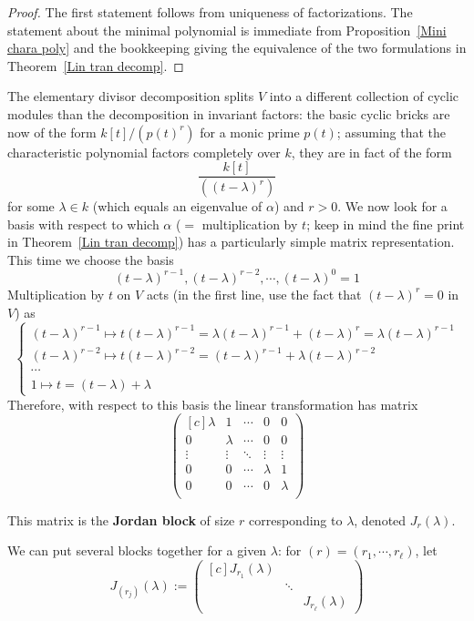 \begin{proof}
The first statement follows from uniqueness of factorizations. The statement about the minimal polynomial is immediate from Proposition~\ref{Mini chara poly} and the bookkeeping giving the equivalence of the two formulations in Theorem~\ref{Lin tran decomp}.
\end{proof}
The elementary divisor decomposition splits $V$ into a different collection of cyclic modules than the decomposition in invariant factors: the basic cyclic bricks
are now of the form $k[t]/(p(t)^r)$ for a monic prime $p(t)$; assuming that the characteristic polynomial factors completely over $k$, they are in fact of the form
\[\dfrac{k[t]}{((t-\lambda)^r)}\]
for some $\lambda\in k$ (which equals an eigenvalue of $\alpha$) and $r>0$. We now look for a basis with respect to which $\alpha$ ($=$ multiplication by $t$; keep in mind the fine print in Theorem~\ref{Lin tran decomp}) has a particularly simple matrix representation. This time we choose the basis
\[(t-\lambda)^{r-1},(t-\lambda)^{r-2},\cdots,(t-\lambda)^0=1\]
Multiplication by $t$ on $V$ acts (in the first line, use the fact that $(t-\lambda)^r=0$ in $V$) as
\[\left\{\begin{array}{l}
(t-\lambda)^{r-1}\mapsto t(t-\lambda)^{r-1}=\lambda(t-\lambda)^{r-1}+(t-\lambda)^r=\lambda(t-\lambda)^{r-1}\\
(t-\lambda)^{r-2}\mapsto t(t-\lambda)^{r-2}=(t-\lambda)^{r-1}+\lambda(t-\lambda)^{r-2}\\
\cdots\\
1\mapsto t=(t-\lambda)+\lambda
\end{array}\right. \]
Therefore, with respect to this basis the linear transformation has matrix
\[\begin{pmatrix*}[c]
\lambda&1&\cdots&0&0\\
0&\lambda&\cdots&0&0\\
\vdots&\vdots&\ddots&\vdots&\vdots\\
0&0&\cdots&\lambda&1\\
0&0&\cdots&0&\lambda\\
\end{pmatrix*}\]
\begin{definition}
This matrix is the \textbf{Jordan block} of size $r$ corresponding to $\lambda$, denoted $J_{r}(\lambda)$.
\end{definition}
We can put several blocks together for a given $\lambda$: for $(r)=(r_1,\cdots,r_\ell)$, let 
\[J_{(r_j)}(\lambda):=\begin{pmatrix*}[c]
J_{r_1}(\lambda)&&\\
&\ddots&\\
&&J_{r_\ell}(\lambda)
\end{pmatrix*}\]

